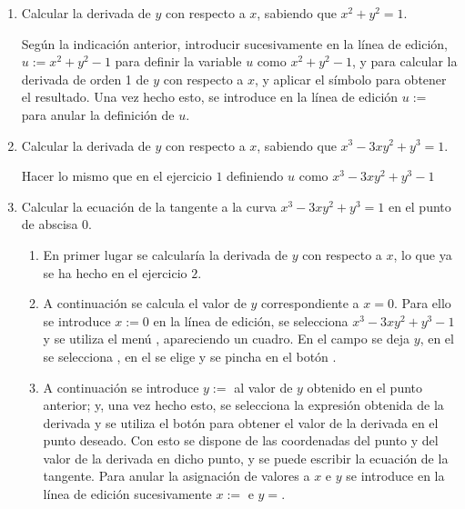 \begin{enumerate}[leftmargin=*]
\item Calcular la derivada de $y$ con respecto a $x$, sabiendo que $x^{2}+y^{2}=1$.\\

\begin{indicacion}
{Según la indicación anterior, introducir sucesivamente en la línea
de edición, $u:=x^{2}+y^{2}-1$ para definir la variable $u$ como
$x^2+y^2-1$, y  para calcular la derivada
de orden 1 de $y$ con respecto a $x$, y aplicar el símbolo \boton{=}
para obtener el resultado. Una vez hecho esto, se introduce en la
línea de edición $u:= $ para anular la definición de $u$.}
\end{indicacion}

\item Calcular la derivada de $y$ con respecto a $x$, sabiendo que $x^{3}-3xy^{2}+y^{3}=1$.
\begin{indicacion}
{Hacer lo mismo que en el ejercicio $1$ definiendo $u$ como
$x^3-3xy^2+y^3-1$}
\end{indicacion}


\item Calcular la ecuación de la tangente a la curva $x^{3}-3xy^{2}+y^{3}=1$ en el punto de abscisa $0$.\\
\begin{indicacion}
{
\begin{enumerate}
\item En primer lugar se calcularía la derivada de $y$ con respecto a
$x$, lo que ya se ha hecho en el ejercicio $2$.

\item A continuación se calcula el valor de $y$ correspondiente a
$x=0$. Para ello se introduce $x:=0$ en la línea de edición, se
selecciona $x^{3}-3xy^{2}+y^{3}-1$ y se utiliza el menú
, apareciendo un cuadro. En el campo
 se deja $y$, en el  se selecciona
, en el  se elige  y
se pincha en el botón .

\item A continuación se introduce $y:=$ al valor de $y$ obtenido en
el punto anterior; y, una vez hecho esto, se selecciona la expresión
obtenida de la derivada y se utiliza el botón \boton{$\approx$} para
obtener el valor de la derivada en el punto deseado. Con esto se
dispone de las coordenadas del punto y del valor de la derivada en
dicho punto, y se puede escribir la ecuación de la tangente. Para
anular la asignación de valores a $x$ e $y$ se introduce en la línea
de edición sucesivamente $x:= $ e $y= $.


\end{enumerate}}
\end{indicacion}
\end{enumerate}
